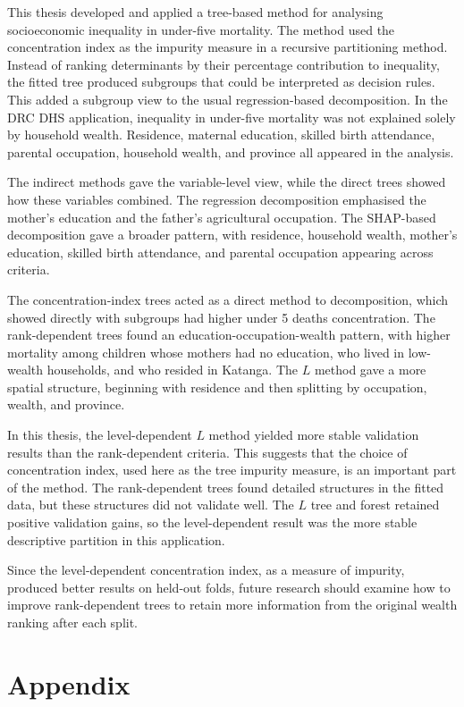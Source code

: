 \documentclass[
  11pt,
  a4paper,
]{article}
\begin{document}
This thesis developed and applied a tree-based method for analysing
socioeconomic inequality in under-five mortality. The method used the
concentration index as the impurity measure in a recursive partitioning
method. Instead of ranking determinants by their percentage contribution
to inequality, the fitted tree produced subgroups that could be
interpreted as decision rules. This added a subgroup view to the usual
regression-based decomposition. In the DRC DHS application, inequality
in under-five mortality was not explained solely by household wealth.
Residence, maternal education, skilled birth attendance, parental
occupation, household wealth, and province all appeared in the analysis.

The indirect methods gave the variable-level view, while the direct
trees showed how these variables combined. The regression decomposition
emphasised the mother's education and the father's agricultural
occupation. The SHAP-based decomposition gave a broader pattern, with
residence, household wealth, mother's education, skilled birth
attendance, and parental occupation appearing across criteria.

The concentration-index trees acted as a direct method to decomposition,
which showed directly with subgroups had higher under 5 deaths
concentration. The rank-dependent trees found an
education-occupation-wealth pattern, with higher mortality among
children whose mothers had no education, who lived in low-wealth
households, and who resided in Katanga. The \(L\) method gave a more
spatial structure, beginning with residence and then splitting by
occupation, wealth, and province.

In this thesis, the level-dependent \(L\) method yielded more stable
validation results than the rank-dependent criteria. This suggests that
the choice of concentration index, used here as the tree impurity
measure, is an important part of the method. The rank-dependent trees
found detailed structures in the fitted data, but these structures did
not validate well. The \(L\) tree and forest retained positive
validation gains, so the level-dependent result was the more stable
descriptive partition in this application.

Since the level-dependent concentration index, as a measure of impurity,
produced better results on held-out folds, future research should
examine how to improve rank-dependent trees to retain more information
from the original wealth ranking after each split.

\section{Appendix}\label{appendix}
\end{document}
